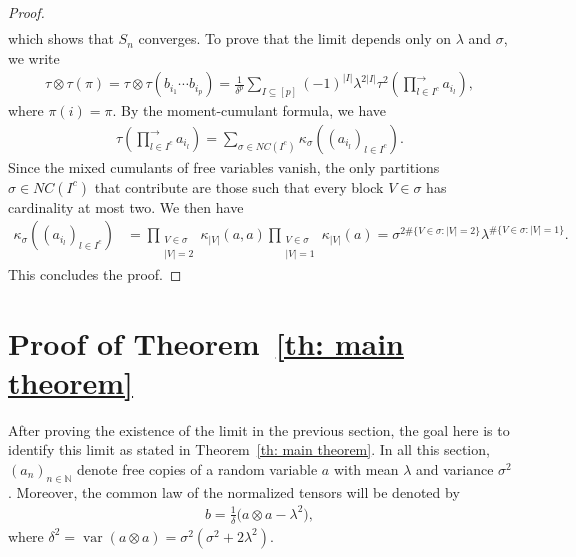 \documentclass[12pt,reqno]{amsart}
\theoremstyle{plain}
\newcommand{\1}{\mathbf{1}}
\newcommand{\var}{\operatorname{var}}
\newcommand{\N}{\mathbb{N}}
\begin{document}
\begin{proof}
\begin{align*}
    \end{align*}
which shows that $S_n$ converges. 
To prove that the limit depends only on $\lambda$ and $\sigma$, we write
\begin{align*}
        \tau\otimes \tau(\pi)=\tau\otimes \tau(b_{i_1}\cdots b_{i_p})=\frac{1}{\delta^p}\sum_{I \subseteq [p]}(-1)^{|I|}\lambda^{2|I|}\tau^2\left(\prod_{l \in I^c}^{\to}a_{i_l}\right),
    \end{align*}
    where $\pi(i)=\pi$. By the moment-cumulant formula, we have
    \begin{align*}
        \tau\left(\prod_{l \in I^c}^{\to}a_{i_l}\right)=\sum_{\sigma \in NC(I^c)} \kappa_\sigma((a_{i_l})_{l \in I^c}).
    \end{align*}
    Since the mixed cumulants of free variables vanish, the only partitions $\sigma \in NC(I^c)$ that contribute are those such that every block $V \in \sigma$ has cardinality at most two. We then have
    \begin{align*}
        \kappa_\sigma((a_{i_l})_{l \in I^c})&=\prod_{\substack{V \in \sigma\\ |V|=2}}\kappa_{|V|}(a,a)\prod_{\substack{V \in \sigma\\ |V|=1}}\kappa_{|V|}(a) =\sigma^{2\#\{V \in \sigma:|V|=2\}}\lambda^{\#\{V \in \sigma:|V|=1\}}.
    \end{align*}
    This concludes the proof.
\end{proof}




\section{Proof of Theorem~\ref{th: main theorem}}\label{section: proof}

After proving the existence of the limit in the previous section, the goal here is to identify this limit as stated in Theorem~\ref{th: main theorem}. In all this section, $(a_n)_{n\in \N}$ denote free copies of a random variable $a$ with mean $\lambda$ and variance $\sigma^2$. Moreover, the common law of the normalized tensors will be denoted by 
\begin{align}\label{equation: common distribution of b}
    b=\frac{1}{\delta}\big(a\otimes a-\lambda^2\big),
\end{align}
where $\delta^2=\var(a\otimes a)=\sigma^2(\sigma^2+2\lambda^2)$. 
\end{document}
